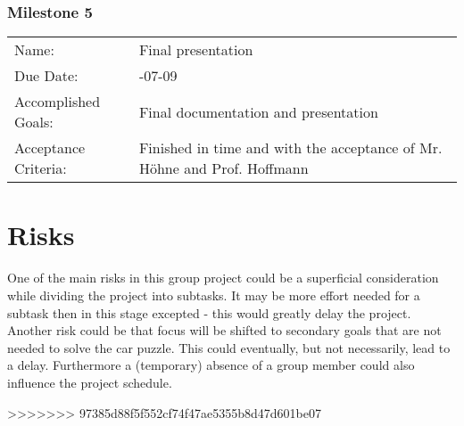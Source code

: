 \documentclass[a4paper, 12pt]{scrartcl}%
\newcommand{\explanation}[1]{{\sffamily #1}}
\begin{document}
	\subsubsection*{Milestone 5}
	\begin{tabular}{lp{10cm}}
		Name:      & \explanation{Final presentation}\\
		Due Date: & \explanation{2019-07-09}\\
		Accomplished Goals: & \explanation{Final documentation and presentation}\\
		Acceptance Criteria: & \explanation{Finished in time and with the acceptance of Mr. Höhne and Prof. Hoffmann}
	\end{tabular}
	
	
	\section{Risks}
	One of the main risks in this group project could be a superficial consideration while dividing the project into subtasks. It may be more effort needed for a subtask then in this stage excepted - this would greatly delay the project. Another risk could be that focus will be shifted to secondary goals that are not needed to solve the car puzzle. This could eventually, but not necessarily, lead to a delay. Furthermore a (temporary) absence of a group member could also influence the project schedule.
	
>>>>>>> 97385d88f5f552cf74f47ae5355b8d47d601be07
\end{document}
